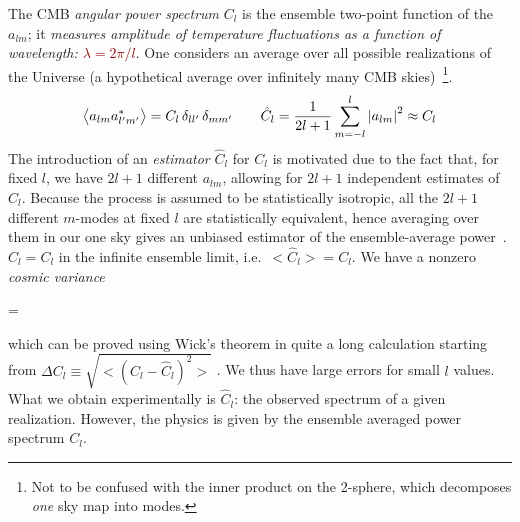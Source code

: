 The CMB \textit{angular power spectrum} $C_l$ is the ensemble two-point function of the $a_{lm}$; it \emph{measures amplitude of temperature fluctuations as a function of wavelength: \textcolor{darkred}{$\lambda = 2\pi/l$}}. One considers an average over all possible realizations of the Universe (a hypothetical average over infinitely many CMB skies)~\footnote{Not to be confused with the inner product on the 2-sphere, which decomposes \emph{one} sky map into modes.}.
\begin{equation}\label{eq:ensembleAverage}
    \bigl<a_{lm}a^*_{l'm'} \bigr>=C_l \,\delta_{ll'}\,\delta_{mm'} \qquad \hat{C}_l = \frac{1}{2l+1} \sum_{m=-l}^l \abs{a_{lm}}^2 \approx C_l
\end{equation}
The introduction of an \textit{estimator} $\hat{C}_l$ for $C_l$ is motivated due to the fact that, for fixed $l$, we have $2l+1$ different $a_{lm}$, allowing for $2l+1$ independent estimates of $C_l$.
Because the process is assumed to be statistically isotropic, all the $2l+1$ different $m$-modes at fixed $l$ are statistically equivalent, hence averaging over them in our one sky gives an unbiased estimator of the ensemble-average power~\cite{CosmologyBau}.
$\hat{C}_l = C_l$ in the infinite ensemble limit, i.e.\ $\bigl<\hat{C}_l \bigr>=C_l$. We have a nonzero \textit{cosmic variance}
\begin{eqopt}[darkred]
    = 
\end{eqopt}
which can be proved using Wick's theorem in quite a long calculation starting from $\Delta C_l \equiv \sqrt{\bigl<(C_l-\hat{C}_l)^2 \bigr>}$ . We thus have large errors for small $l$ values.
What we obtain experimentally is $\hat{C}_l$: the observed spectrum of a given realization. However, the physics is given by the ensemble averaged power spectrum $C_l$.

 

